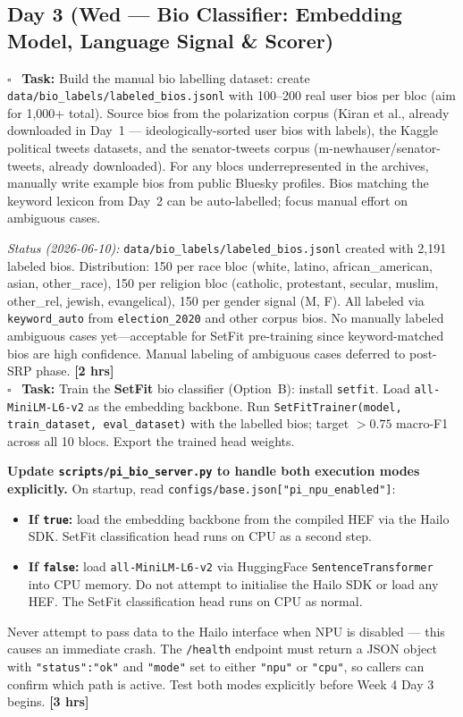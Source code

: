 \documentclass[11pt]{article}
\newcommand{\hrs}[1]{\textbf{[#1 hrs]}}
\newcommand{\dayhead}[2]{%
  \subsection*{Day #1 \normalfont\small\color{codegray}(#2)}}
\newcommand{\task}[2]{%
  \noindent\textbf{Task:} #1 \hfill \hrs{#2}\\}
\newcommand{\done}{\textcolor{sectionblue}{$\square$}\ }
\begin{document}
\dayhead{3}{Wed --- Bio Classifier: Embedding Model, Language Signal \& Scorer}

\begin{taskbox}
\done \task{Build the manual bio labelling dataset: create
  \texttt{data/bio\_labels/labeled\_bios.jsonl} with 100--200 real user
  bios per bloc (aim for 1,000+ total). Source bios from the polarization
  corpus (Kiran et al., already downloaded in Day~1 --- ideologically-sorted
  user bios with labels), the Kaggle political tweets datasets, and the
  senator-tweets corpus (m-newhauser/senator-tweets, already downloaded). For any blocs underrepresented in the archives,
  manually write example bios from public Bluesky profiles. Bios matching the
  keyword lexicon from Day~2 can be auto-labelled; focus manual effort on
  ambiguous cases.

  \smallskip\textit{Status (2026-06-10):} \texttt{data/bio\_labels/labeled\_bios.jsonl}
  created with 2,191 labeled bios. Distribution: 150 per race bloc (white, latino,
  african\_american, asian, other\_race), 150 per religion bloc (catholic, protestant,
  secular, muslim, other\_rel, jewish, evangelical), 150 per gender signal (M, F).
  All labeled via \texttt{keyword\_auto} from \texttt{election\_2020} and other corpus
  bios. No manually labeled ambiguous cases yet---acceptable for SetFit pre-training
  since keyword-matched bios are high confidence. Manual labeling of ambiguous cases
  deferred to post-SRP phase.}{2}

\done \task{Train the \textbf{SetFit} bio classifier (Option~B): install
  \texttt{setfit}. Load \texttt{all-MiniLM-L6-v2} as the embedding backbone.
  Run \texttt{SetFitTrainer(model, train\_dataset, eval\_dataset)} with the
  labelled bios; target $> 0.75$ macro-F1 across all 10 blocs. Export the
  trained head weights.

  \textbf{Update \texttt{scripts/pi\_bio\_server.py} to handle both
  execution modes explicitly.} On startup, read
  \texttt{configs/base.json["pi\_npu\_enabled"]}:
  \begin{itemize}[leftmargin=1.6em, itemsep=1pt]
    \item \textbf{If \texttt{true}:} load the embedding backbone from the
          compiled HEF via the Hailo SDK. SetFit classification head runs
          on CPU as a second step.
    \item \textbf{If \texttt{false}:} load \texttt{all-MiniLM-L6-v2} via
          HuggingFace \texttt{SentenceTransformer} into
          CPU memory. Do not attempt to initialise the Hailo SDK or load any
          HEF. The SetFit classification head runs on CPU as normal.
  \end{itemize}
  Never attempt to pass data to the Hailo interface when NPU is disabled ---
  this causes an immediate crash. The \texttt{/health} endpoint must return a
  JSON object with \texttt{"status":"ok"} and \texttt{"mode"} set to either
  \texttt{"npu"} or \texttt{"cpu"}, so callers can confirm which path is active.
  Test both modes explicitly before Week 4 Day 3 begins.}{3}


\end{taskbox}
\end{document}
